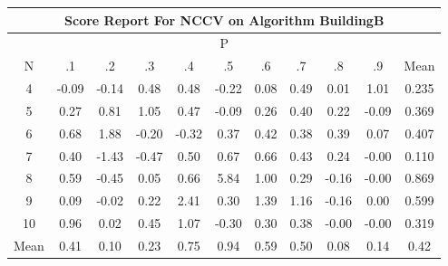 \documentclass[11pt,a4paper]{report}
\begin{document}
\begin{longtable}{ | c || c | c | c | c | c | c | c | c | c || c |}
\hline
\multicolumn{11}{|c|}{ Score Report For NCCV on Algorithm BuildingB} \\
\hline
\multicolumn{11}{|c|}{ P } \\
\hline
N & .1 & .2 & .3 & .4 & .5 & .6 & .7 & .8 & .9 & Mean\\
 \hline
 \hline
 \endhead
  4 &  \cellcolor[HTML]{FFFFFF} -0.09 &  \cellcolor[HTML]{FFFFFF} -0.14 &  \cellcolor[HTML]{EFEFFF} 0.48 &  \cellcolor[HTML]{EFEFFF} 0.48 &  \cellcolor[HTML]{FFF7F7} -0.22 &  \cellcolor[HTML]{FFFFFF} 0.08 &  \cellcolor[HTML]{EFEFFF} 0.49 &  \cellcolor[HTML]{FFFFFF} 0.01 &  \cellcolor[HTML]{E7E7FF} 1.01 & 0.235 \\
  5 &  \cellcolor[HTML]{F7F7FF} 0.27 &  \cellcolor[HTML]{E7E7FF} 0.81 &  \cellcolor[HTML]{E7E7FF} 1.05 &  \cellcolor[HTML]{F7F7FF} 0.47 &  \cellcolor[HTML]{FFFFFF} -0.09 &  \cellcolor[HTML]{F7F7FF} 0.26 &  \cellcolor[HTML]{F7F7FF} 0.40 &  \cellcolor[HTML]{F7F7FF} 0.22 &  \cellcolor[HTML]{FFFFFF} -0.09 & 0.369 \\
  6 &  \cellcolor[HTML]{EFEFFF} 0.68 &  \cellcolor[HTML]{CFCFFF} 1.88 &  \cellcolor[HTML]{FFF7F7} -0.20 &  \cellcolor[HTML]{FFF7F7} -0.32 &  \cellcolor[HTML]{F7F7FF} 0.37 &  \cellcolor[HTML]{F7F7FF} 0.42 &  \cellcolor[HTML]{F7F7FF} 0.38 &  \cellcolor[HTML]{F7F7FF} 0.39 &  \cellcolor[HTML]{FFFFFF} 0.07 & 0.407 \\
  7 &  \cellcolor[HTML]{F7F7FF} 0.40 &  \cellcolor[HTML]{FFD7D7} -1.43 &  \cellcolor[HTML]{FFF7F7} -0.47 &  \cellcolor[HTML]{EFEFFF} 0.50 &  \cellcolor[HTML]{EFEFFF} 0.67 &  \cellcolor[HTML]{EFEFFF} 0.66 &  \cellcolor[HTML]{F7F7FF} 0.43 &  \cellcolor[HTML]{F7F7FF} 0.24 &  \cellcolor[HTML]{FFFFFF} -0.00 & 0.110 \\
  8 &  \cellcolor[HTML]{EFEFFF} 0.59 &  \cellcolor[HTML]{FFF7F7} -0.45 &  \cellcolor[HTML]{FFFFFF} 0.05 &  \cellcolor[HTML]{EFEFFF} 0.66 &  \cellcolor[HTML]{7070FF} 5.84 &  \cellcolor[HTML]{E7E7FF} 1.00 &  \cellcolor[HTML]{F7F7FF} 0.29 &  \cellcolor[HTML]{FFF7F7} -0.16 &  \cellcolor[HTML]{FFFFFF} -0.00 & 0.869 \\
  9 &  \cellcolor[HTML]{FFFFFF} 0.09 &  \cellcolor[HTML]{FFFFFF} -0.02 &  \cellcolor[HTML]{F7F7FF} 0.22 &  \cellcolor[HTML]{BFBFFF} 2.41 &  \cellcolor[HTML]{F7F7FF} 0.30 &  \cellcolor[HTML]{DFDFFF} 1.39 &  \cellcolor[HTML]{DFDFFF} 1.16 &  \cellcolor[HTML]{FFFFFF} -0.16 &  \cellcolor[HTML]{FFFFFF} 0.00 & 0.599 \\
  10 &  \cellcolor[HTML]{E7E7FF} 0.96 &  \cellcolor[HTML]{FFFFFF} 0.02 &  \cellcolor[HTML]{F7F7FF} 0.45 &  \cellcolor[HTML]{E7E7FF} 1.07 &  \cellcolor[HTML]{FFF7F7} -0.30 &  \cellcolor[HTML]{F7F7FF} 0.30 &  \cellcolor[HTML]{F7F7FF} 0.38 &  \cellcolor[HTML]{FFFFFF} -0.00 &  \cellcolor[HTML]{FFFFFF} -0.00 & 0.319 \\
 \hline
 \hline
Mean &  \cellcolor[HTML]{F7F7FF} 0.41 &  \cellcolor[HTML]{FFFFFF} 0.10 &  \cellcolor[HTML]{F7F7FF} 0.23 &  \cellcolor[HTML]{EFEFFF} 0.75 &  \cellcolor[HTML]{E7E7FF} 0.94 &  \cellcolor[HTML]{EFEFFF} 0.59 &  \cellcolor[HTML]{EFEFFF} 0.50 &  \cellcolor[HTML]{FFFFFF} 0.08 &  \cellcolor[HTML]{FFFFFF} 0.14 &  \cellcolor[HTML]{F7F7FF} 0.42
\end{longtable}
\end{document}
